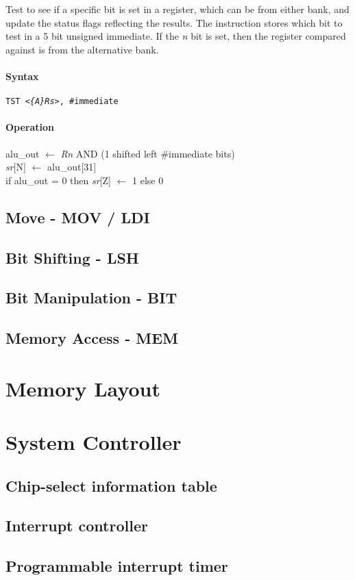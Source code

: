 \documentclass[a4paper,twoside]{book}
\begin{document}
        Test to see if a specific bit is set in a register, which can be from
        either bank, and update the status flags reflecting the results.  The
        instruction stores which bit to test in a 5 bit unsigned immediate.
        If the \emph{n} bit is set, then the register compared against is from
        the alternative bank.
        \subsubsection*{Syntax}
          \texttt{TST <\emph{\{A\}Rs}>, \#immediate}
        \subsubsection*{Operation}
          \begin{texttt}
            alu\_out $\gets$ \emph{Rn} AND (1 shifted left \#immediate bits)\\
            \emph{sr}[N] $\gets$ alu\_out[31]\\
            if alu\_out = 0 then \emph{sr}[Z] $\gets$ 1 else 0
          \end{texttt}
      \newpage
     
    \section{Move - MOV / LDI}
    \section{Bit Shifting - LSH}    
    \section{Bit Manipulation - BIT}
    \section{Memory Access - MEM}
  
  \chapter{Memory Layout}
  
  \chapter{System Controller}
    \section{Chip-select information table}
    \section{Interrupt controller}
    \section{Programmable interrupt timer}
\end{document}
